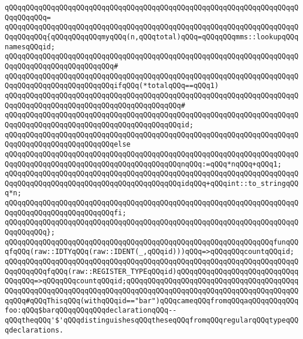 \verb|qQQqqQQqqQQqqQQqqQQqqQQqqQQqqQQqqQQqqQQqqQQqqQQqqQQqqQQqqQQqqQQqqQQqqQQqqQQqqQQq=|\newline
\verb|qQQqqQQqqQQqqQQqqQQqqQQqqQQqqQQqqQQqqQQqqQQqqQQqqQQqqQQqqQQqqQQqqQQqqQQqqQQqqQQq{qQQqqQQqqQQqmyqQQq(n,qQQqtotal)qQQq=qQQqqQQqmms::lookupqQQqnamesqQQqid;|\newline
\verb|qQQqqQQqqQQqqQQqqQQqqQQqqQQqqQQqqQQqqQQqqQQqqQQqqQQqqQQqqQQqqQQqqQQqqQQqqQQqqQQqqQQqqQQqqQQqqQQq#|\newline
\verb|qQQqqQQqqQQqqQQqqQQqqQQqqQQqqQQqqQQqqQQqqQQqqQQqqQQqqQQqqQQqqQQqqQQqqQQqqQQqqQQqqQQqqQQqqQQqqQQqifqQQq(*totalqQQq==qQQq1)|\newline
\verb|qQQqqQQqqQQqqQQqqQQqqQQqqQQqqQQqqQQqqQQqqQQqqQQqqQQqqQQqqQQqqQQqqQQqqQQqqQQqqQQqqQQqqQQqqQQqqQQqqQQqqQQqqQQqqQQq#|\newline
\verb|qQQqqQQqqQQqqQQqqQQqqQQqqQQqqQQqqQQqqQQqqQQqqQQqqQQqqQQqqQQqqQQqqQQqqQQqqQQqqQQqqQQqqQQqqQQqqQQqqQQqqQQqqQQqqQQqid;|\newline
\verb|qQQqqQQqqQQqqQQqqQQqqQQqqQQqqQQqqQQqqQQqqQQqqQQqqQQqqQQqqQQqqQQqqQQqqQQqqQQqqQQqqQQqqQQqqQQqqQQqelse|\newline
\verb|qQQqqQQqqQQqqQQqqQQqqQQqqQQqqQQqqQQqqQQqqQQqqQQqqQQqqQQqqQQqqQQqqQQqqQQqqQQqqQQqqQQqqQQqqQQqqQQqqQQqqQQqqQQqqQQqnqQQq:=qQQq*nqQQq+qQQq1;|\newline
\verb|qQQqqQQqqQQqqQQqqQQqqQQqqQQqqQQqqQQqqQQqqQQqqQQqqQQqqQQqqQQqqQQqqQQqqQQqqQQqqQQqqQQqqQQqqQQqqQQqqQQqqQQqqQQqqQQqidqQQq+qQQqint::to_stringqQQq*n;|\newline
\verb|qQQqqQQqqQQqqQQqqQQqqQQqqQQqqQQqqQQqqQQqqQQqqQQqqQQqqQQqqQQqqQQqqQQqqQQqqQQqqQQqqQQqqQQqqQQqqQQqfi;|\newline
\verb|qQQqqQQqqQQqqQQqqQQqqQQqqQQqqQQqqQQqqQQqqQQqqQQqqQQqqQQqqQQqqQQqqQQqqQQqqQQqqQQq};|\newline
\newline
\verb|qQQqqQQqqQQqqQQqqQQqqQQqqQQqqQQqqQQqqQQqqQQqqQQqqQQqqQQqqQQqqQQqfunqQQqfqQQq(raw::IDTYqQQq(raw::IDENT(_,qQQqid)))qQQq=>qQQqqQQqcountqQQqid;|\newline
\verb|qQQqqQQqqQQqqQQqqQQqqQQqqQQqqQQqqQQqqQQqqQQqqQQqqQQqqQQqqQQqqQQqqQQqqQQqqQQqqQQqfqQQq(raw::REGISTER_TYPEqQQqid)qQQqqQQqqQQqqQQqqQQqqQQqqQQqqQQqqQQq=>qQQqqQQqcountqQQqid;qQQqqQQqqQQqqQQqqQQqqQQqqQQqqQQqqQQqqQQqqQQqqQQqqQQqqQQqqQQqqQQqqQQqqQQqqQQqqQQqqQQqqQQqqQQqqQQqqQQqqQQqqQQqqQQqqQQq#qQQqThisqQQq(withqQQqid=="bar")qQQqcameqQQqfromqQQqaqQQqqQQqqQQqfoo:qQQq$barqQQqqQQqqQQqdeclarationqQQq--qQQqtheqQQq'$'qQQqdistinguishesqQQqtheseqQQqfromqQQqregularqQQqtypeqQQqdeclarations.|\newline
